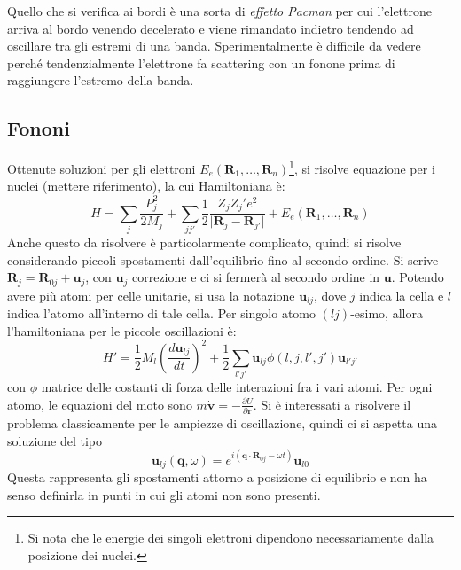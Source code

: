 \documentclass[10pt, a4paper]{scrartcl}
\numberwithin{equation}{subsection}
\theoremstyle{style1}
\theoremstyle{style2}
\begin{document}
Quello che si verifica ai bordi \`e una sorta di \textit{effetto Pacman} per cui l'elettrone arriva al bordo venendo decelerato e viene rimandato indietro tendendo ad oscillare tra gli estremi di una banda. Sperimentalmente \`e difficile da vedere perch\'e tendenzialmente l'elettrone fa scattering con un fonone prima di raggiungere l'estremo della banda.


\subsection{Fononi}
Ottenute soluzioni per gli elettroni $E_e (\mathbf{R} _1, \ldots, \mathbf{R} _n)$\footnote{Si nota che le energie dei singoli elettroni dipendono necessariamente dalla posizione dei nuclei.}, si risolve equazione per i nuclei {\color{red}(mettere riferimento)}, la cui Hamiltoniana \`e:
\begin{equation}
	H = \sum_{j}^{} \frac{P^2_j}{2M_j} + \sum_{jj'}^{} \frac{1}{2} \frac{Z_jZ_j'e^2}{\lvert \mathbf{R} _j - \mathbf{R} _{j'}  \rvert } + E_e(\mathbf{R} _1,\ldots,\mathbf{R} _n)
\end{equation}
Anche questo da risolvere \`e particolarmente complicato, quindi si risolve considerando piccoli spostamenti dall'equilibrio fino al secondo ordine.
Si scrive $\mathbf{R} _j = \mathbf{R} _{0j} +\mathbf{u} _j$, con $\mathbf{u}_j$ correzione e ci si fermer\`a al secondo ordine in $\mathbf{u} $.
Potendo avere pi\`u atomi per celle unitarie, si usa la notazione $\mathbf{u} _{ lj} $, dove $j$ indica la cella e $l$ indica l'atomo all'interno di tale cella.
Per singolo atomo $(lj)$-esimo, allora l'hamiltoniana per le piccole oscillazioni \`e:
\begin{equation}
	H ' = \frac{1}{2}M_l \left(\frac{d \mathbf{u} _{lj} }{d t} \right) ^2 + \frac{1}{2} \sum_{l'j'}^{} \mathbf{u} _{lj} \phi (l,j,l',j') \mathbf{u} _{l'j'} 
\end{equation}
con $\phi $ matrice delle costanti di forza delle interazioni fra i vari atomi. Per ogni atomo, le equazioni del moto sono $m\dot{\mathbf{v} }= - \frac{\partial U}{\partial \mathbf{r} } $. Si \`e interessati a risolvere il problema classicamente per le ampiezze di oscillazione, quindi ci si aspetta una soluzione del tipo
\[
\mathbf{u} _{lj} (\mathbf{q} ,\omega) = e^{i (\mathbf{q} \cdot \mathbf{R}_{0j} - \omega t )} \mathbf{u} _{l0} 
\] 
Questa rappresenta gli spostamenti attorno a posizione di equilibrio e non ha senso definirla in punti in cui gli atomi non sono presenti. 
\end{document}
